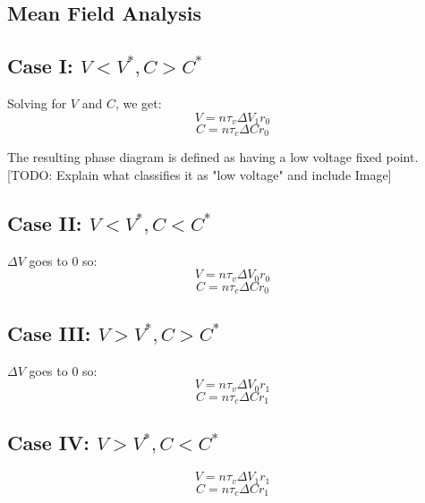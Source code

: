 \documentclass[11pt,letterpaper]{article}
\begin{document}
\begin{appendices}
\section{Mean Field Analysis}
\label{appendix:mean_field_analysis}
\subsection*{Case I: $V < V^*, C > C^*$}
Solving for $V$ and $C$, we get:
\begin{equation}
V = n\tau _v \Delta V_1 r_0
\end{equation}
\begin{equation}
C = n\tau _c \Delta C r_0
\end{equation}

The resulting phase diagram is defined as having a low voltage fixed point. [TODO: Explain what classifies it as "low voltage" and include Image]

\subsection*{Case II: $V < V^*, C < C^*$}
$\Delta V$ goes to 0 so:
\begin{equation}
V = n\tau _v \Delta V_0 r_0
\end{equation}
\begin{equation}
C = n\tau _c \Delta C r_0
\end{equation}

\subsection*{Case III: $V > V^*, C > C^*$}
$\Delta V$ goes to 0 so:
\begin{equation}
V = n\tau _v \Delta V_0 r_1
\end{equation}
\begin{equation}
C = n\tau _c \Delta C r_1
\end{equation}

\subsection*{Case IV: $V > V^*, C < C^*$}
\begin{equation}
V = n\tau_v \Delta V_1 r_1
\end{equation}
\begin{equation}
C = n\tau_c \Delta C r_1
\end{equation}


\end{appendices}
\end{document}
